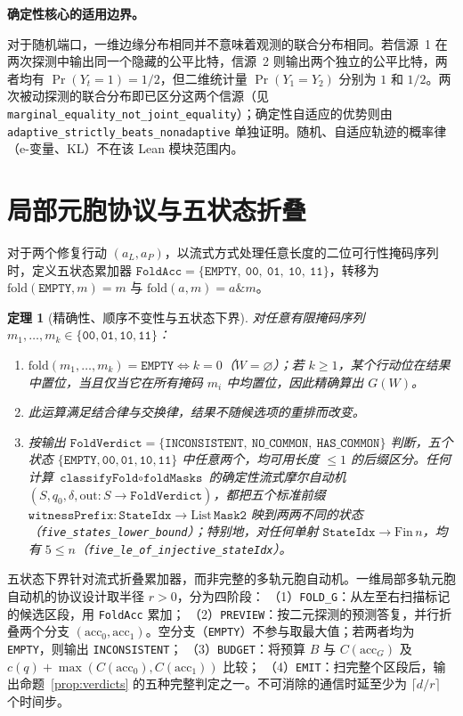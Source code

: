 \documentclass[11pt,a4paper]{article}
\theoremstyle{preprintthm}
\newtheorem{theorem}{定理}[section]
\theoremstyle{preprintdef}
\newcommand{\subheading}[1]{\par\addvspace{8pt}\noindent\textbf{#1}\par\nobreak}
\begin{document}
\subheading{确定性核心的适用边界。}
对于随机端口，一维边缘分布相同并不意味着观测的联合分布相同。若信源~1 在两次探测中输出同一个隐藏的公平比特，信源~2 则输出两个独立的公平比特，两者均有 $\Pr(Y_t=1)=1/2$，但二维统计量 $\Pr(Y_1=Y_2)$ 分别为 $1$ 和 $1/2$。两次被动探测的联合分布即已区分这两个信源（见 \texttt{marginal\_\allowbreak equality\_\allowbreak not\_\allowbreak joint\_\allowbreak equality}）；确定性自适应的优势则由 \texttt{adaptive\_\allowbreak strictly\_\allowbreak beats\_\allowbreak nonadaptive} 单独证明。随机、自适应轨迹的概率律（e-变量、KL）不在该 Lean 模块范围内。

\section{局部元胞协议与五状态折叠}

对于两个修复行动 $(a_L,a_P)$，以流式方式处理任意长度的二位可行性掩码序列时，定义五状态累加器 $\texttt{FoldAcc}=\{\texttt{EMPTY},\ \texttt{00},\ \texttt{01},\ \texttt{10},\ \texttt{11}\}$，转移为 $\mathrm{fold}(\texttt{EMPTY},m)=m$ 与 $\mathrm{fold}(a,m)=a\mathbin{\&}m$。

\begin{theorem}[精确性、顺序不变性与五状态下界]
\label{thm:fold5}
对任意有限掩码序列 $m_1,\dots,m_k\in\{\texttt{00},\texttt{01},\texttt{10},\texttt{11}\}$：
\begin{enumerate}
  \item $\mathrm{fold}(m_1,\dots,m_k)=\texttt{EMPTY}\iff k=0$（$W=\varnothing$）；若 $k\ge1$，某个行动位在结果中置位，当且仅当它在所有掩码 $m_i$ 中均置位，因此精确算出 $G(W)$。
  \item 此运算满足结合律与交换律，结果不随候选项的重排而改变。
  \item 按输出 $\texttt{FoldVerdict}=\{\texttt{INCONSISTENT},\ \texttt{NO\_COMMON},\ \texttt{HAS\_COMMON}\}$ 判断，五个状态 $\{\texttt{EMPTY},\texttt{00},\texttt{01},\texttt{10},\texttt{11}\}$ 中任意两个，均可用长度 $\le1$ 的后缀区分。任何计算 $\texttt{classifyFold}\circ\texttt{foldMasks}$ 的确定性流式摩尔自动机 $(S,q_0,\delta,\mathrm{out}:S\to\texttt{FoldVerdict})$，都把五个标准前缀 $\texttt{witnessPrefix}:\texttt{StateIdx}\to\mathrm{List}\,\texttt{Mask2}$ 映到两两不同的状态（\texttt{five\_states\_lower\_bound}）；特别地，对任何单射 $\texttt{StateIdx}\to\mathrm{Fin}\,n$，均有 $5\le n$（\texttt{five\_le\_of\_injective\_stateIdx}）。
\end{enumerate}
\end{theorem}

五状态下界针对流式折叠累加器，而非完整的多轨元胞自动机。一维局部多轨元胞自动机的协议设计取半径 $r>0$，分为四阶段：
（1）\texttt{FOLD\_G}：从左至右扫描标记的候选区段，用 \texttt{FoldAcc} 累加；
（2）\texttt{PREVIEW}：按二元探测的预测答复，并行折叠两个分支 $(\mathrm{acc}_0,\mathrm{acc}_1)$。空分支（\texttt{EMPTY}）不参与取最大值；若两者均为 \texttt{EMPTY}，则输出 \texttt{INCONSISTENT}；
（3）\texttt{BUDGET}：将预算 $B$ 与 $C(\mathrm{acc}_G)$ 及 $c(q)+\max(C(\mathrm{acc}_0),C(\mathrm{acc}_1))$ 比较；
（4）\texttt{EMIT}：扫完整个区段后，输出命题~\ref{prop:verdicts} 的五种完整判定之一。不可消除的通信时延至少为 $\lceil d/r\rceil$ 个时间步。
\end{document}
